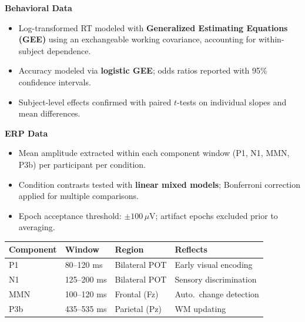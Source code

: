 \begin{tcolorbox}[posterbox]
\SmallText
\textbf{Behavioral Data}
\begin{itemize}
  \item Log-transformed RT modeled with \textbf{Generalized Estimating Equations (GEE)} using an exchangeable working covariance, accounting for within-subject dependence.
  \item Accuracy modeled via \textbf{logistic GEE}; odds ratios reported with 95\% confidence intervals.
  \item Subject-level effects confirmed with paired $t$-tests on individual slopes and mean differences.
\end{itemize}

\textbf{ERP Data}
\begin{itemize}
  \item Mean amplitude extracted within each component window (P1, N1, MMN, P3b) per participant per condition.
  \item Condition contrasts tested with \textbf{linear mixed models}; Bonferroni correction applied for multiple comparisons.
  \item Epoch acceptance threshold: $\pm 100\,\mu\mathrm{V}$; artifact epochs excluded prior to averaging.
\end{itemize}

\begin{center}
{\renewcommand{\arraystretch}{1.35}
\begin{tabular}{@{}llll@{}}
\toprule
\textbf{Component} & \textbf{Window} & \textbf{Region} & \textbf{Reflects} \\
\midrule
P1   & 80--120 ms   & Bilateral POT & Early visual encoding \\
N1   & 125--200 ms  & Bilateral POT & Sensory discrimination \\
MMN  & 100--120 ms  & Frontal (Fz)  & Auto.\ change detection \\
P3b  & 435--535 ms  & Parietal (Pz) & WM updating \\
\bottomrule
\end{tabular}}
\end{center}
\end{tcolorbox}
